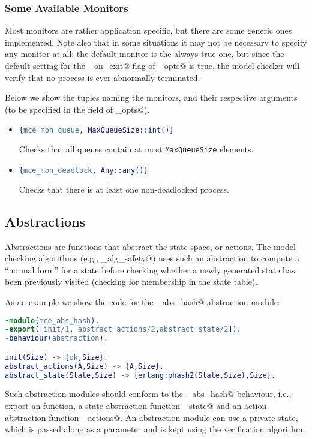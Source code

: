 \documentclass[a4paper]{article}
\begin{document}
\subsubsection{Some Available Monitors}
Most monitors are rather application specific, but there are 
some generic ones implemented. Note also that in some situations
it may not be necessary to specify any monitor at all; the default
monitor is the always true one, but since the default setting
for the \lstinline@fail_on_exit@ flag of \lstinline@mce_opts@
is true, the model checker will verify that no process 
is ever abnormally terminated.

Below we show the tuples naming the monitors, and their
respective arguments (to be specified in the \lstinline@monitor@
field of \lstinline@mce_opts@).
\begin{itemize}
\item
\begin{lstlisting}[language=Erlang]
{mce_mon_queue, MaxQueueSize::int()}
\end{lstlisting}
Checks that all queues contain at most \lstinline{MaxQueueSize} elements.

\item
\begin{lstlisting}[language=Erlang]
{mce_mon_deadlock, Any::any()}
\end{lstlisting}
Checks that there is at least one non-deadlocked process.
\end{itemize}

\subsection{Abstractions}
\label{abstractions}
Abstractions are functions that abstract the state space,
or actions. The model checking algorithms (e.g., \lstinline@mce_alg_safety@)
uses such an abstraction to compute a ``normal form'' for a state
before checking whether a newly generated state has been previously
visited (checking for membership in the state table).

As an example we show the code for the \lstinline@mce_abs_hash@
abstraction module:
\begin{lstlisting}[language=Erlang]
-module(mce_abs_hash).
-export([init/1, abstract_actions/2,abstract_state/2]).
-behaviour(abstraction).

init(Size) -> {ok,Size}.
abstract_actions(A,Size) -> {A,Size}.
abstract_state(State,Size) -> {erlang:phash2(State,Size),Size}.
\end{lstlisting}
Such abstraction modules should conform to the \lstinline@mce_abs_hash@
behaviour, i.e., export an \lstinline@init@ function,
a state abstraction function \lstinline@abstract_state@
and an action abstraction function \lstinline@abstract_actions@.
An abstraction module can use a private state, which is passed
along as a parameter and is kept using the verification algorithm.
\end{document}
